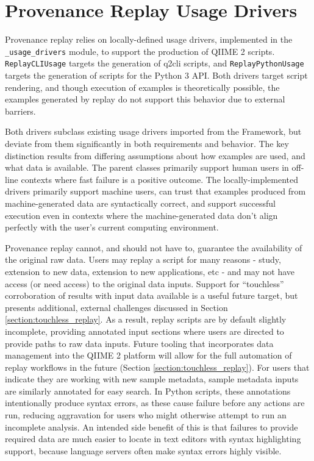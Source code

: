 \section{Provenance Replay Usage Drivers}

Provenance replay relies on locally-defined usage drivers, implemented in the
\texttt{\_usage\_drivers} module, to support the production of QIIME 2 scripts. \texttt{ReplayCLIUsage}
targets the generation of q2cli scripts, and \texttt{ReplayPythonUsage} targets the
generation of scripts for the Python 3 API. Both drivers target script
rendering, and though execution of examples is theoretically possible, the examples
generated by replay do not support this behavior due to external barriers.

Both drivers subclass existing usage drivers imported from the Framework, but
deviate from them significantly in both requirements and behavior. The key
distinction results from differing assumptions about how examples are used, and
what data is available. The parent classes primarily support human users in
off-line contexts where fast failure is a positive outcome. The
locally-implemented drivers primarily support machine users, can trust that
examples produced from machine-generated data are syntactically correct, and
support successful execution even in contexts where the machine-generated data
don’t align perfectly with the user’s current computing environment. 

Provenance replay cannot, and should not have to, guarantee the availability of
the original raw data. Users may replay a script for many reasons - study,
extension to new data, extension to new applications, etc - and may not have
access (or need access) to the original data inputs. Support for “touchless”
corroboration of results with input data available is a useful future target,
but presents additional, external challenges discussed in Section \ref{section:touchless_replay}.
As a result, replay scripts are by default slightly incomplete, providing annotated
input sections where users are directed to provide paths to raw data inputs.
Future tooling that incorporates data management into the QIIME 2 platform will
allow for the full automation of replay workflows in the future (Section
\ref{section:touchless_replay}). For users that indicate they are working with new sample metadata,
sample metadata inputs are similarly annotated for easy search. In Python
scripts, these annotations intentionally produce syntax errors, as these cause
failure before any actions are run, reducing aggravation for users who might
otherwise attempt to run an incomplete analysis. An intended side benefit of
this is that failures to provide required data are much easier to locate in text
editors with syntax highlighting support, because language servers often make
syntax errors highly visible.

